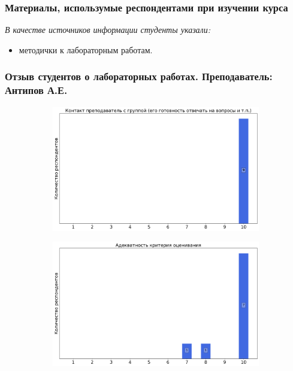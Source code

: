 	\subsubsection{Материалы, использумые респондентами при изучении курса}

		\textit{В качестве источников информации студенты указали:} 
		\begin{itemize}
			\item методички к лабораторным работам.
		\end{itemize}


    \subsubsection{Отзыв студентов о лабораторных работах. Преподаватель: Антипов А.Е.}
		\begin{figure}[H]
			\centering
			\begin{subfigure}[b]{0.45\textwidth}
				\centering
				\includegraphics[width=\textwidth]{images/3 course/Радиофизическая лаборатория/labniks-marks-Борисов Д.А.-0.png}
			\end{subfigure}
			\begin{subfigure}[b]{0.45\textwidth}
				\centering
				\includegraphics[width=\textwidth]{images/3 course/Радиофизическая лаборатория/labniks-marks-Борисов Д.А.-1.png}

\end{subfigure}
\end{figure}
